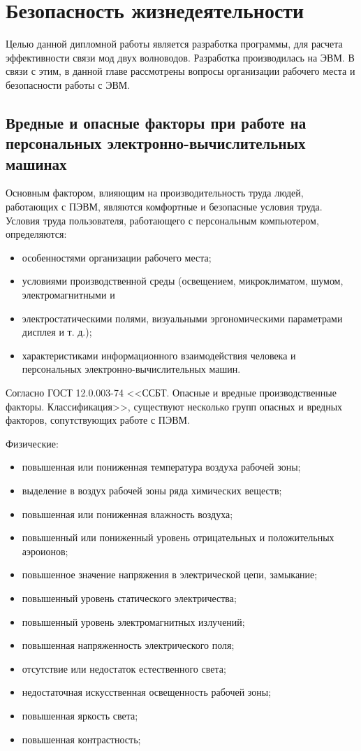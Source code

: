 \chapter{Безопасность жизнедеятельности}

Целью данной дипломной работы является разработка программы, для расчета эффективности связи мод двух волноводов. Разработка производилась на ЭВМ. В связи с этим, в данной главе рассмотрены вопросы организации рабочего места и безопасности работы с ЭВМ. 

\section{Вредные и опасные факторы при работе на персональных электронно-вычислительных машинах}

Основным фактором, влияющим на производительность труда людей, работающих с ПЭВМ, являются комфортные и безопасные условия труда. Условия труда пользователя, работающего с персональным компьютером, определяются:
\begin{itemize}
	\item особенностями организации рабочего места;
	\item условиями производственной среды (освещением, микроклиматом, шумом, электромагнитными и 			\item электростатическими полями, визуальными эргономическими параметрами дисплея и т. д.);
	\item характеристиками информационного взаимодействия человека и персональных электронно-вычислительных машин.
\end{itemize}

Согласно ГОСТ 12.0.003-74 <<ССБТ. Опасные и вредные производственные факторы. Классификация>>, существуют несколько групп опасных и вредных факторов, сопутствующих работе с ПЭВМ.

\noindent Физические:
\begin{itemize}
	\item повышенная или пониженная температура воздуха рабочей зоны;
	\item выделение в воздух рабочей зоны ряда химических веществ;
	\item повышенная или пониженная влажность воздуха;
	\item повышенный или пониженный уровень отрицательных и положительных аэроионов;
	\item повышенное значение напряжения в электрической цепи, замыкание;
	\item повышенный уровень статического электричества;
	\item повышенный уровень электромагнитных излучений;
	\item повышенная напряженность электрического поля;
	\item отсутствие или недостаток естественного света;
	\item недостаточная искусственная освещенность рабочей зоны;
	\item повышенная яркость света;
	\item повышенная контрастность;
\end{itemize}

